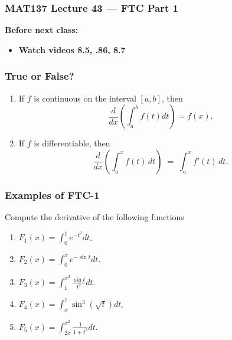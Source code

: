\documentclass[14pt]{beamer}
\newcommand{\setsize}[1]{\fontsize{#1}{#1}\selectfont} %
\newcommand{\smallerfont}{\setsize{13}} %
\begin{document}
\begin{frame}
	\frametitle{MAT137 Lecture 43 --- FTC Part 1}

	\vfill
	{\bf Before next class:}
		\begin{itemize} \normalsize
			\item {\bf Watch videos 8.5, .86, 8.7}
		\end{itemize}
\end{frame}
	\begin{frame}[t]
		\smallerfont
		\frametitle{True or False?}

		\begin{enumerate}
			\item If $f$ is continuous on the interval $[a,b]$, then
				\[
					\frac{d}{dx}\left( \int_{a}^{b} f(t)dt\right)=f(x).
				\]

				\vspace{4mm}

			\item If $f$ is differentiable, then
				\[
					\frac{d}{dx}\left(\int_{a}^{x} f(t)\,dt \right) \; = \; \int_{a}^{x} f'
					(t) \,dt .
				\]
		\end{enumerate}
	\end{frame}

	\begin{frame}[t]
		\smallerfont
		\frametitle{Examples of FTC-1}

		Compute the derivative of the following functions

		\begin{enumerate}
			\item ${\displaystyle F_1(x) = \int_0^1 e^{-t^2} dt}$. \\
				\vfill

			\item ${\displaystyle F_2(x) = \int_0^x e^{-\sin t} dt}$. \\
				\vfill

			\item ${\displaystyle F_3(x) = \int_1^{x^2} \frac{\sin t}{t^{2}} dt}$. \\
				\vfill

			\item ${\displaystyle F_4(x) = \! \int_x^7 \sin^3 \! \! \left( \sqrt{t} \right) \! dt}$.
				\\
				\vfill

			\item ${\displaystyle F_5(x) = \int_{2x}^{x^2} \frac{1}{1+t^{3}} dt}$. \\
		\end{enumerate}
	\end{frame}
\end{document}
